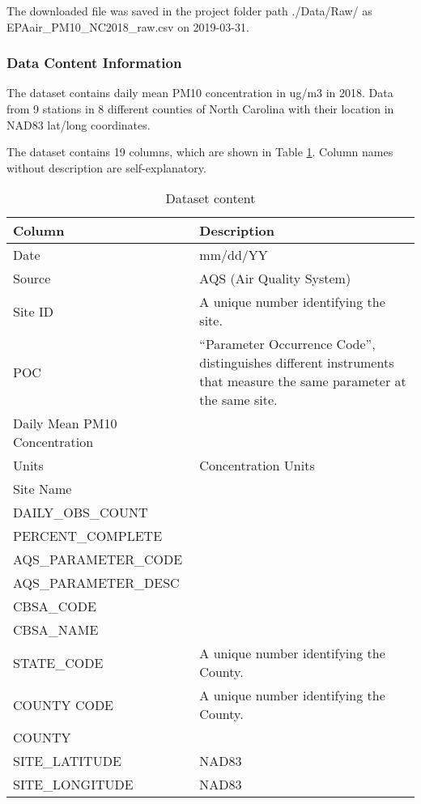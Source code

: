 \documentclass[12pt,]{article}
\begin{document}
The downloaded file was saved in the project folder path ./Data/Raw/ as
EPAair\_PM10\_NC2018\_raw.csv on 2019-03-31.

\subsubsection{Data Content
Information}\label{data-content-information-1}

The dataset contains daily mean PM10 concentration in ug/m3 in 2018.
Data from 9 stations in 8 different counties of North Carolina with
their location in NAD83 lat/long coordinates.

The dataset contains 19 columns, which are shown in Table
\ref{tab:tab5}. Column names without description are self-explanatory.

\begin{table}[ht]
\centering
\begin{tabular}{p{2.5in}p{3.5in}}
  \hline
Column & Description \\ 
  \hline
Date & mm/dd/YY \\ 
  Source & AQS (Air Quality System) \\ 
  Site ID & A unique number identifying the site. \\ 
  POC & “Parameter Occurrence Code”, distinguishes different instruments that measure the same parameter at the same site. \\ 
  Daily Mean PM10 Concentration &  \\ 
  Units & Concentration Units \\ 
  Site Name &  \\ 
  DAILY\_OBS\_COUNT &  \\ 
  PERCENT\_COMPLETE &  \\ 
  AQS\_PARAMETER\_CODE &  \\ 
  AQS\_PARAMETER\_DESC &  \\ 
  CBSA\_CODE &  \\ 
  CBSA\_NAME &  \\ 
  STATE\_CODE & A unique number identifying the County. \\ 
  COUNTY CODE & A unique number identifying the County. \\ 
  COUNTY &  \\ 
  SITE\_LATITUDE & NAD83 \\ 
  SITE\_LONGITUDE & NAD83 \\ 
   \hline
\end{tabular}
\caption{Dataset content} 
\label{tab:tab5}
\end{table}
\end{document}
